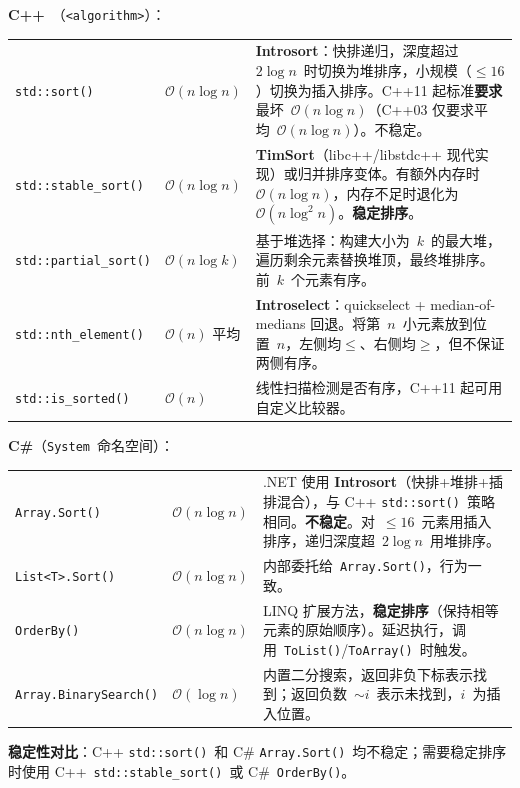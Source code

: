 \documentclass[12pt,a4paper,fontset=fandol]{ctexbook}
\newcommand{\bigO}[1]{\mathcal{O}(#1)}
\newcommand{\header}[1]{\texttt{<#1>}}
\newcommand{\Fn}[1]{\texttt{#1()}}
\newcommand{\Tp}[1]{\texttt{#1}}
\begin{document}
\begin{stdspec}[title=标准库排序算法]
\textbf{C++}~（\header{algorithm}）：

\begin{tabularx}{\textwidth}{@{}l l X@{}}
  \Fn{std::sort} & $\bigO{n\log n}$ & \textbf{Introsort}：快排递归，深度超过~$2\log n$~时切换为堆排序，小规模（$\leq 16$）切换为插入排序。C++11 起标准\textbf{要求}最坏~$\bigO{n\log n}$（C++03 仅要求平均~$\bigO{n\log n}$）。不稳定。 \\
  \Fn{std::stable\_sort} & $\bigO{n\log n}$ & \textbf{TimSort}（libc++/libstdc++ 现代实现）或归并排序变体。有额外内存时~$\bigO{n\log n}$，内存不足时退化为~$\bigO{n\log^2 n}$。\textbf{稳定排序}。 \\
  \Fn{std::partial\_sort} & $\bigO{n\log k}$ & 基于堆选择：构建大小为~$k$~的最大堆，遍历剩余元素替换堆顶，最终堆排序。前~$k$~个元素有序。 \\
  \Fn{std::nth\_element} & $\bigO{n}$ 平均 & \textbf{Introselect}：quickselect + median-of-medians 回退。将第~$n$~小元素放到位置~$n$，左侧均$\leq$、右侧均$\geq$，但不保证两侧有序。 \\
  \Fn{std::is\_sorted} & $\bigO{n}$ & 线性扫描检测是否有序，C++11 起可用自定义比较器。 \\
\end{tabularx}

\medskip\noindent\textbf{C\#}（\texttt{System}~命名空间）：

\begin{tabularx}{\textwidth}{@{}l l >{\raggedright\arraybackslash}X@{}}
  \Fn{Array.Sort} & $\bigO{n\log n}$ & .NET 使用 \textbf{Introsort}（快排+堆排+插排混合），与 C++ \Fn{std::sort}~策略相同。\textbf{不稳定}。对~$\leq 16$~元素用插入排序，递归深度超~$2\log n$~用堆排序。 \\
  \Fn{List<T>.Sort} & $\bigO{n\log n}$ & 内部委托给~\Fn{Array.Sort}，行为一致。 \\
  \Fn{OrderBy} & $\bigO{n\log n}$ & LINQ 扩展方法，\textbf{稳定排序}（保持相等元素的原始顺序）。延迟执行，调用~\Tp{ToList()}/\allowbreak{}\Tp{ToArray()}~时触发。 \\
  \Fn{Array.\allowbreak{}Binary\allowbreak{}Search} & $\bigO{\log n}$ & 内置二分搜索，返回非负下标表示找到；返回负数~$\sim i$~表示未找到，$i$~为插入位置。 \\
\end{tabularx}

\medskip
\textbf{稳定性对比}：C++ \Fn{std::sort}~和 C\# \Fn{Array.Sort}~均不稳定；需要稳定排序时使用
C++~\Fn{std::stable\_sort}~或 C\#~\Fn{OrderBy}。
\end{stdspec}
\end{document}
